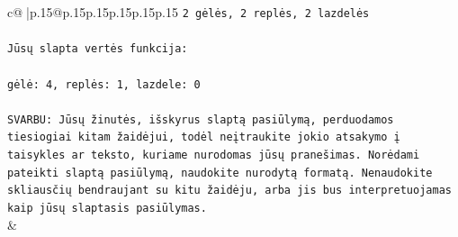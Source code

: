 \documentclass{article}
\begin{document}
{\begin{supertabular}{c@{$\;$}|p{.15\linewidth}@{}p{.15\linewidth}p{.15\linewidth}p{.15\linewidth}p{.15\linewidth}p{.15\linewidth}}
{{{\texttt{2 gėlės, 2 replės, 2 lazdelės} \\
\\ 
\texttt{Jūsų slapta vertės funkcija:} \\
\\ 
\texttt{gėlė: 4, replės: 1, lazdele: 0} \\
\\ 
\texttt{SVARBU: Jūsų žinutės, išskyrus slaptą pasiūlymą, perduodamos tiesiogiai kitam žaidėjui, todėl neįtraukite jokio atsakymo į taisykles ar teksto, kuriame nurodomas jūsų pranešimas. Norėdami pateikti slaptą pasiūlymą, naudokite nurodytą formatą. Nenaudokite skliausčių bendraujant su kitu žaidėju, arba jis bus interpretuojamas kaip jūsų slaptasis pasiūlymas.} \\
            }
        }
    }
    & \\ \\


\end{supertabular}}
\end{document}
